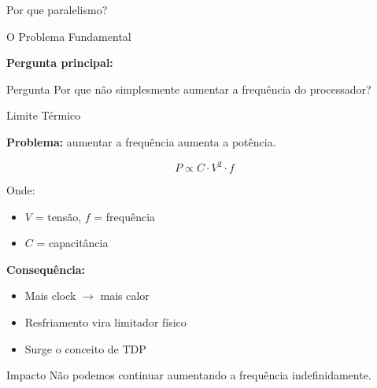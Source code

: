 \documentclass[aspectratio=169,11pt]{beamer}
\newcommand{\sectionframe}[1]{%
    {%
    \setbeamertemplate{frametitle}{}%
    \begin{frame}
        \centering
        \vfill

        {\Large #1}

        \vfill
    \end{frame}
    }%
}
\begin{document}
\sectionframe{Por que paralelismo?}



\begin{frame}{O Problema Fundamental}

    \vspace{0.25cm}

    \textbf{Pergunta principal:}

    \vspace{0.35cm}

    \begin{questionbox}{Pergunta}
        Por que não simplesmente aumentar a frequência do
        processador?
    \end{questionbox}

\end{frame}



\begin{frame}{Limite Térmico}

    \textbf{Problema:}
    aumentar a frequência aumenta a potência.

    \vspace{0.15cm}

    \[
        P \propto C \cdot V^2 \cdot f
    \]

    Onde:

    \begin{itemize}
        \item $V$ = tensão, $f$ = frequência
        \item $C$ = capacitância
    \end{itemize}

    \vspace{0.10cm}

    \textbf{Consequência:}

    \begin{itemize}
        \item Mais clock $\rightarrow$ mais calor
        \item Resfriamento vira limitador físico
        \item Surge o conceito de TDP
    \end{itemize}

    \vspace{0.10cm}

    \begin{impactbox}{Impacto}
        Não podemos continuar aumentando a frequência
        indefinidamente.
    \end{impactbox}

\end{frame}
\end{document}
